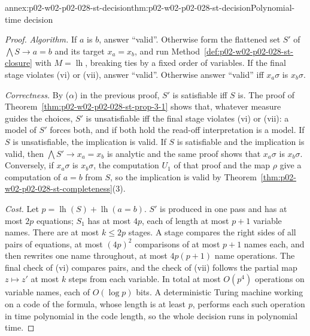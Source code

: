\begin{annexitem}{annex:p02-w02-p02-028-st-decision}{thm:p02-w02-p02-028-st-decision}{Polynomial-time decision}
\begin{proof}
\emph{Algorithm.}  If \(a\) is \(b\), answer ``valid''.  Otherwise form the
flattened set \(S'\) of \(\bigwedge S\to a=b\) and its target \(x_a=x_b\),
and run Method~\ref{def:p02-w02-p02-028-st-closure} with
\(M=\operatorname{lh}\), breaking ties by a fixed order of variables.  If the
final stage violates (vi) or (vii), answer ``valid''.  Otherwise answer
``valid'' iff \(x_a\sigma\) is \(x_b\sigma\).

\emph{Correctness.}  By (\(\alpha\)) in the previous proof, \(S'\) is
satisfiable iff \(S\) is.  The proof of
Theorem~\ref{thm:p02-w02-p02-028-st-prop-3-1} shows that, whatever measure
guides the choices, \(S'\) is unsatisfiable iff the final stage violates (vi)
or (vii): a model of \(S'\) forces both, and if both hold the read-off
interpretation is a model.  If \(S\) is unsatisfiable, the implication is
valid.  If \(S\) is satisfiable and the implication is valid, then
\(\bigwedge S'\to x_a=x_b\) is analytic and the same proof shows that
\(x_a\sigma\) is \(x_b\sigma\).  Conversely, if \(x_a\sigma\) is
\(x_b\sigma\), the computation \(U_1\) of that proof and the map \(\rho\) give
a computation of \(a=b\) from \(S\), so the implication is valid by
Theorem~\ref{thm:p02-w02-p02-028-st-completeness}(3).

\emph{Cost.}  Let \(p=\operatorname{lh}(S)+\operatorname{lh}(a=b)\).  \(S'\)
is produced in one pass and has at most \(2p\) equations; \(S_1\) has at most
\(4p\), each of length at most \(p+1\) variable names.  There are at most
\(k\leq2p\) stages.  A stage compares the right sides of all pairs of
equations, at most \((4p)^2\) comparisons of at most \(p+1\) names each, and
then rewrites one name throughout, at most \(4p(p+1)\) name operations.  The
final check of (vi) compares pairs, and the check of (vii) follows the
partial map \(z\mapsto z'\) at most \(k\) steps from each variable.  In total
at most \(O(p^4)\) operations on variable names, each of
\(O(\log p)\) bits.  A deterministic Turing machine working on a code of the
formula, whose length is at least \(p\), performs each such operation in time
polynomial in the code length, so the whole decision runs in polynomial time.
\end{proof}
\end{annexitem}

